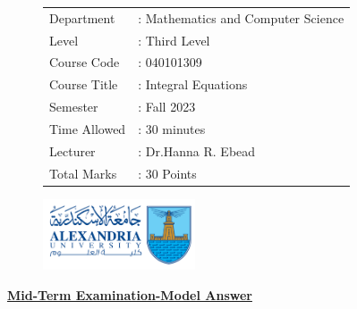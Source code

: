 \documentclass[]{article}
\begin{document}
\thispagestyle{empty}
\begin{figure}
    \begin{minipage}{0.7\textwidth}
        \begin{tabular}{l l}
            Department   & : Mathematics and Computer Science \\
            Level        & : Third Level                      \\
            Course Code  & : 040101309                        \\
            Course Title & :  Integral Equations              \\
            Semester     & : Fall 2023                        \\
            Time Allowed & : 30 minutes                       \\
            Lecturer     & : Dr.Hanna R. Ebead                \\
            Total Marks  & : 30 Points                        \\
        \end{tabular}
    \end{minipage}%
    \begin{minipage}{0.3\textwidth}
        \includegraphics[width=4.5cm]{collagelogo.png}
    \end{minipage}
\end{figure}
\vspace*{-1cm}
\begin{center}
    \textbf{\underline{\LARGE Mid-Term Examination-Model Answer}}
\end{center}
\vspace*{.2cm}
\end{document}
